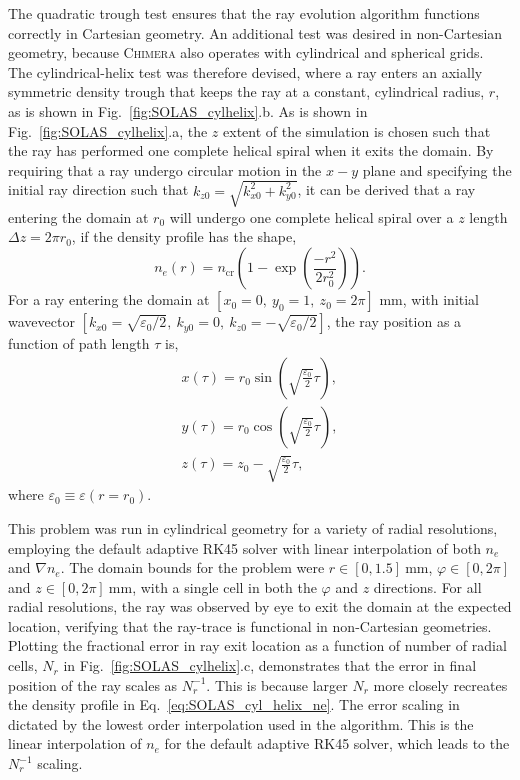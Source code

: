 The quadratic trough test ensures that the ray evolution algorithm functions correctly in Cartesian geometry.
An additional test was desired in non-Cartesian geometry, because \textsc{Chimera} also operates with cylindrical and spherical grids.
The cylindrical-helix test was therefore devised, where a ray enters an axially symmetric density trough that keeps the ray at a constant, cylindrical radius, $r$, as is shown in Fig.~\ref{fig:SOLAS_cylhelix}.b.
As is shown in Fig.~\ref{fig:SOLAS_cylhelix}.a, the $z$ extent of the simulation is chosen such that the ray has performed one complete helical spiral when it exits the domain.
By requiring that a ray undergo circular motion in the $x-y$ plane and specifying the initial ray direction such that $k_{z0}=\sqrt{k_{x0}^2+k_{y0}^2}$, it can be derived that a ray entering the domain at $r_0$ will undergo one complete helical spiral over a $z$ length $\Delta z= 2\pi r_0$, if the density profile has the shape,
\begin{equation}
    \label{eq:SOLAS_cyl_helix_ne}
    n_e(r) = n_{\text{cr}} \left( 1-\exp{\left( \frac{-r^2}{2r_0^2} \right)} \right).
\end{equation}
For a ray entering the domain at $[x_0=0,\ y_0=1,\ z_0=2\pi]$ mm, with initial wavevector $[k_{x0}=\sqrt{\varepsilon_0/2},\ k_{y0}=0,\ k_{z0}=-\sqrt{\varepsilon_0/2}]$, the ray position as a function of path length $\tau$ is,
\begin{equation}
    \begin{gathered}
        x(\tau) = r_0\sin{\left( \sqrt{\frac{\varepsilon_0}{2}}\tau \right)}, \\
        y(\tau) = r_0\cos{\left( \sqrt{\frac{\varepsilon_0}{2}}\tau \right)}, \\
        z(\tau) = z_0 - \sqrt{\frac{\varepsilon_0}{2}}\tau,
    \end{gathered}
\end{equation}
where $\varepsilon_0\equiv\varepsilon(r=r_0)$.

This problem was run in cylindrical geometry for a variety of radial resolutions, employing the default adaptive RK45 solver with linear interpolation of both $n_e$ and $\nabla n_e$.
The domain bounds for the problem were $r \in [0,1.5]\ \text{mm}$, $\varphi \in [0,2\pi]$ and $z \in [0,2\pi]\ \text{mm}$, with a single cell in both the $\varphi$ and $z$ directions.
For all radial resolutions, the ray was observed by eye to exit the domain at the expected location, verifying that the ray-trace is functional in non-Cartesian geometries.
Plotting the fractional error in ray exit location as a function of number of radial cells, $N_r$ in Fig.~\ref{fig:SOLAS_cylhelix}.c, demonstrates that the error in final position of the ray scales as $N_r^{-1}$.
This is because larger $N_r$ more closely recreates the density profile in Eq.~\ref{eq:SOLAS_cyl_helix_ne}.
The error scaling in dictated by the lowest order interpolation used in the algorithm.
This is the linear interpolation of $n_e$ for the default adaptive RK45 solver, which leads to the $N_r^{-1}$ scaling.

